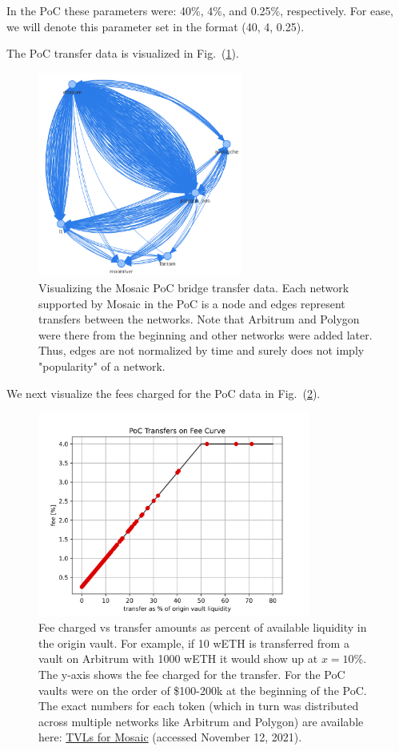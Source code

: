 In the PoC these parameters were: 40\%, 4\%, and 0.25\%, respectively. For ease, we will denote this parameter set in the format (40, 4, 0.25).

The PoC transfer data is visualized in Fig.~(\ref{fig:pocdatavis}).
%
\begin{figure}
    \centering
    \includegraphics[width=0.6\textwidth]{images/mosaic/pocdata.png}
    \caption{Visualizing the Mosaic PoC bridge transfer data. Each network supported by Mosaic in the PoC is a node and edges represent transfers between the networks. Note that Arbitrum and Polygon were there from the beginning and other networks were added later. Thus, edges are not normalized by time and surely does not imply "popularity" of a network.}
    \label{fig:pocdatavis}
\end{figure}
%
We next visualize the fees charged for the PoC data in Fig.~(\ref{fig:pocdatafees}).
%
\begin{figure}
    \centering
    \includegraphics[width=0.8\textwidth]{images/mosaic/poc_transfer_on_fee_curve.png}
    \caption{Fee charged vs transfer amounts as percent of available liquidity in the origin vault. For example, if 10 wETH is transferred from a vault on Arbitrum with 1000 wETH it would show up at $x=10$\%. The y-axis shows the fee charged for the transfer. For the PoC vaults were on the order of \$100-200k at the beginning of the PoC. The exact numbers for each token (which in turn was distributed across multiple networks like Arbitrum and Polygon) are available here: \href{https://mosaic.composable.finance/earn}{TVLs for Mosaic} (accessed November 12, 2021).}
    \label{fig:pocdatafees}
\end{figure}
